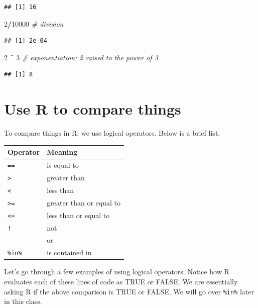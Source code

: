 \documentclass[
]{book}
\newenvironment{Shaded}{\begin{snugshade}}{\end{snugshade}}
\newcommand{\CommentTok}[1]{\textcolor[rgb]{0.56,0.35,0.01}{\textit{#1}}}
\newcommand{\DecValTok}[1]{\textcolor[rgb]{0.00,0.00,0.81}{#1}}
\newcommand{\SpecialCharTok}[1]{\textcolor[rgb]{0.81,0.36,0.00}{\textbf{#1}}}
\begin{document}
\begin{verbatim}
## [1] 16
\end{verbatim}

\begin{Shaded}
\begin{Highlighting}[]
\DecValTok{2}\SpecialCharTok{/}\DecValTok{10000} \CommentTok{\# division}
\end{Highlighting}
\end{Shaded}

\begin{verbatim}
## [1] 2e-04
\end{verbatim}

\begin{Shaded}
\begin{Highlighting}[]
\DecValTok{2} \SpecialCharTok{\^{}} \DecValTok{3} \CommentTok{\# exponentiation: 2 raised to the power of 3}
\end{Highlighting}
\end{Shaded}

\begin{verbatim}
## [1] 8
\end{verbatim}

\section{Use R to compare things}\label{use-r-to-compare-things}

To compare things in R, we use logical operators. Below is a brief list.

\begin{longtable}[]{@{}ll@{}}
\toprule\noalign{}
Operator & Meaning \\
\midrule\noalign{}
\endhead
\bottomrule\noalign{}
\endlastfoot
\texttt{==} & is equal to \\
\texttt{\textgreater{}} & greater than \\
\texttt{\textless{}} & less than \\
\texttt{\textgreater{}=} & greater than or equal to \\
\texttt{\textless{}=} & less than or equal to \\
\texttt{!} & not \\
\texttt{\textbar{}} & or \\
\texttt{\%in\%} & is contained in \\
\end{longtable}

Let's go through a few examples of using logical operators. Notice how R evaluates each of these lines of code as TRUE or FALSE. We are essentially asking R if the above comparison is TRUE or FALSE. We will go over \texttt{\%in\%} later in this class.
\end{document}
